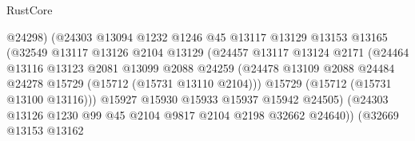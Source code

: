 \begin{lexlean}{RustCore}
\begin{coremodule}
                                    @24298)
                                  (@24303
                                    @13094
                                    @1232
                                    @1246
                                    @45
                                    @13117
                                    @13129
                                    @13153
                                    @13165
                                    (@32549
                                      @13117
                                      @13126
                                      @2104
                                      @13129
                                      (@24457
                                        @13117
                                        @13124
                                        @2171
                                        (@24464
                                          @13116
                                          @13123
                                          @2081
                                          @13099
                                          @2088
                                          @24259
                                          (@24478
                                            @13109
                                            @2088
                                            @24484
                                            @24278
                                            @15729
                                            (@15712 (@15731 @13110 @2104)))
                                          @15729
                                          (@15712 (@15731 @13100 @13116)))
                                        @15927
                                        @15930
                                        @15933
                                        @15937
                                        @15942
                                        @24505)
                                      (@24303
                                        @13126
                                        @1230
                                        @99
                                        @45
                                        @2104
                                        @9817
                                        @2104
                                        @2198
                                        @32662
                                        @24640))
                                    (@32669
                                      @13153
                                      @13162

\end{coremodule}
\end{lexlean}
